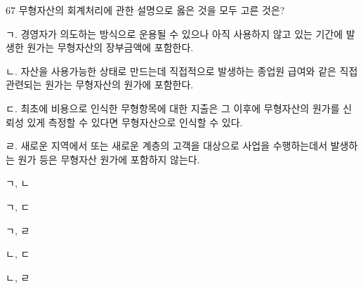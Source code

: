 \begin{question}{67}
무형자산의 회계처리에 관한 설명으로 옳은 것을 모두 고른 것은?
\begin{framedtext}
ㄱ. 경영자가 의도하는 방식으로 운용될 수 있으나 아직 사용하지 않고 있는 기간에 발생한 원가는 무형자산의 장부금액에 포함한다. \par
ㄴ. 자산을 사용가능한 상태로 만드는데 직접적으로 발생하는 종업원 급여와 같은 직접 관련되는 원가는 무형자산의 원가에 포함한다. \par
ㄷ. 최초에 비용으로 인식한 무형항목에 대한 지출은 그 이후에 무형자산의 원가를 신뢰성 있게 측정할 수 있다면 무형자산으로 인식할 수 있다. \par
ㄹ. 새로운 지역에서 또는 새로운 계층의 고객을 대상으로 사업을 수행하는데서 발생하는 원가 등은 무형자산 원가에 포함하지 않는다.
\end{framedtext}
\begin{choices}
  \item ㄱ, ㄴ
  \item ㄱ, ㄷ
  \item ㄱ, ㄹ
  \item ㄴ, ㄷ
  \item ㄴ, ㄹ
\end{choices}
\end{question}
